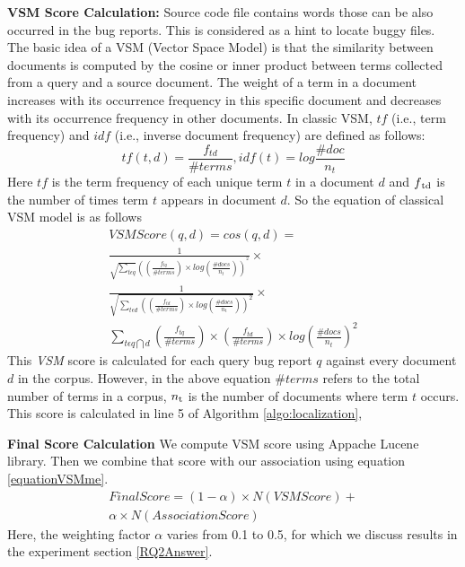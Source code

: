 \documentclass[conference]{IEEEtran}
\begin{document}
\textbf{VSM Score Calculation:}
Source code file contains words those can be also occurred in the bug reports. This is considered as a hint to locate buggy files. 
The basic idea of a VSM (Vector Space Model) is that the similarity between documents is computed by the cosine or inner product between terms collected from a query and a source document.
The weight of a term in a document increases with its occurrence frequency in this specific document and decreases with its occurrence frequency in other documents.
In classic VSM, {$tf$} (i.e., term frequency) and {$idf$} (i.e., inverse document frequency) are defined as follows:
\begin{equation}
tf(t,d)=\frac{f_{td}}{\#terms}, idf(t)=log\frac{\#doc}{n_{t}}
\end{equation}
Here $tf$ is the term frequency of each unique term {$t$} in a document {$d$} and {$f\textsubscript{td}$} is the number of times term {$t$} appears in document {$d$}.
So the equation of classical VSM model is as follows
\begin{multline}\label{VSMequation}
VSMScore(q,d)= cos(q,d) =
\\
\frac{1}{\sqrt{\sum_{t\epsilon q}}((\frac{f_{tq}}{\#terms})\times log(\frac{\#docs}{n_{t}}))^{^{2}}}\times 
\\
\frac{1}{\sqrt{\sum_{t\epsilon d}((\frac{f_{td}}{\#terms})\times log(\frac{\#docs}{n_{t}}))^{2}}}\times
\\
\sum_{t\epsilon q\bigcap d}(\frac{f_{tq}}{\#terms})\times (\frac{f_{td}}{\#terms})\times log(\frac{\#docs}{n_{t}})^{2}
\end{multline}
This \textit{VSM} score is calculated for each query bug report {$q$} against every document {$d$} in the corpus. However, in the above equation {$\#terms$} refers to the total number of terms in a corpus, {$n\textsubscript{t}$} is the number of documents where term {$t$} occurs. This score is calculated in line 5 of Algorithm \ref{algo:localization},




\textbf{Final Score Calculation}
We compute VSM score using Appache Lucene library. Then we combine that score with our association using equation \ref{equationVSMme}.
\begin{multline}\label{equationVSMme}
FinalScore=(1-\alpha )\times N(VSMScore)+ \\
\alpha \times N(AssociationScore)
\end{multline}
Here, the weighting factor $\alpha$ varies from 0.1 to 0.5, for which we discuss results in the experiment section \ref{RQ2Answer}. 
\end{document}
